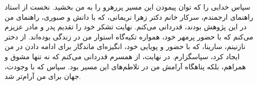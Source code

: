 سپاس خدایی را که توان پیمودن این مسیر پررهرو را به من بخشید. نخست از استاد راهنمای ارجمندم، سرکار خانم دکتر زهرا نریمانی، که با دانش و صبوری، راهنمای من در این پژوهش بودند، قدردانی می‌کنم. نهایت تشکر خود را تقدیم پدر و مادر عزیزم می‌کنم که با حضور پرمهر خود، همواره تکیه‌گاه استوار من در زندگی بوده‌اند. از دختر نازنینم، سارینا، که با حضور و پویایی خود، انگیزه‌ای ماندگار برای ادامه دادن در من ایجاد کرد، سپاسگزارم. در نهایت، از همسرم قدردانی می‌کنم که نه تنها مشوق و همراهم، بلکه پناهگاه آرامش من در تلاطم‌های این مسیر بود. سپاس که با وجودت، جهان برای من آرام‌تر شد.